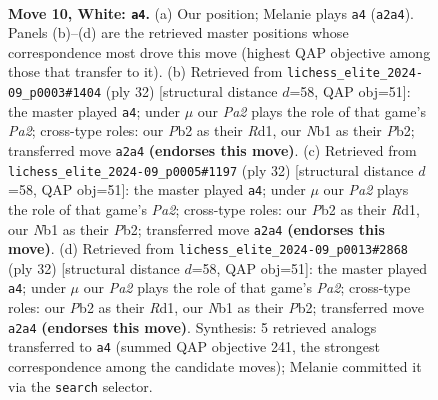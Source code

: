 \documentclass[11pt]{article}
\begin{document}
\clearpage

\begin{figure}[p]\centering
\begin{subfigure}{0.46\textwidth}\centering
\resizebox{\linewidth}{!}{%
\newchessgame
\chessboard[
  setfen={rnbkr3/1p3ppp/p3pn2/2b5/8/1B2PN2/PP3PPP/RNB2RK1 w - - 2 10},
  showmover=false,
  pgfstyle=straightmove, color=movearrow, markmove={a2-a4}
]}
\caption{}
\end{subfigure}\hfill
\begin{subfigure}{0.46\textwidth}\centering
\resizebox{\linewidth}{!}{%
\newchessgame
\chessboard[
  setfen={r1b2rk1/5ppp/p3pn2/1pb5/8/3BPN2/PP3PPP/R1BR2K1 w - - 0 17},
  showmover=false,
  pgfstyle=straightmove, color=movearrow, markmove={a2-a4}
]}
\caption{}
\end{subfigure}
\\[4pt]
\begin{subfigure}{0.46\textwidth}\centering
\resizebox{\linewidth}{!}{%
\newchessgame
\chessboard[
  setfen={r1b2rk1/5ppp/p3pn2/1pb5/8/3BPN2/PP3PPP/R1BR2K1 w - - 0 17},
  showmover=false,
  pgfstyle=straightmove, color=movearrow, markmove={a2-a4}
]}
\caption{}
\end{subfigure}\hfill
\begin{subfigure}{0.46\textwidth}\centering
\resizebox{\linewidth}{!}{%
\newchessgame
\chessboard[
  setfen={r1b2rk1/5ppp/p3pn2/1pb5/8/3BPN2/PP3PPP/R1BR2K1 w - - 0 17},
  showmover=false,
  pgfstyle=straightmove, color=movearrow, markmove={a2-a4}
]}
\caption{}
\end{subfigure}
\caption{\textbf{Move 10, White: \texttt{a4}.} (a) Our position; Melanie plays \texttt{a4} (\texttt{a2a4}). Panels (b)--(d) are the retrieved master positions whose correspondence most drove this move (highest QAP objective among those that transfer to it). (b) Retrieved from \texttt{lichess\_elite\_2024-09\_p0003\#1404} (ply 32) [structural distance $d$=58, QAP obj=51]: the master played \texttt{a4}; under $\mu$ our \emph{Pa2} plays the role of that game's \emph{Pa2}; cross-type roles: our \emph{P}b2 as their \emph{R}d1, our \emph{N}b1 as their \emph{P}b2; transferred move \texttt{a2a4} \textbf{(endorses this move)}. (c) Retrieved from \texttt{lichess\_elite\_2024-09\_p0005\#1197} (ply 32) [structural distance $d$=58, QAP obj=51]: the master played \texttt{a4}; under $\mu$ our \emph{Pa2} plays the role of that game's \emph{Pa2}; cross-type roles: our \emph{P}b2 as their \emph{R}d1, our \emph{N}b1 as their \emph{P}b2; transferred move \texttt{a2a4} \textbf{(endorses this move)}. (d) Retrieved from \texttt{lichess\_elite\_2024-09\_p0013\#2868} (ply 32) [structural distance $d$=58, QAP obj=51]: the master played \texttt{a4}; under $\mu$ our \emph{Pa2} plays the role of that game's \emph{Pa2}; cross-type roles: our \emph{P}b2 as their \emph{R}d1, our \emph{N}b1 as their \emph{P}b2; transferred move \texttt{a2a4} \textbf{(endorses this move)}. Synthesis: 5 retrieved analogs transferred to \texttt{a4} (summed QAP objective 241, the strongest correspondence among the candidate moves); Melanie committed it via the \texttt{search} selector.}
\label{fig:thought-m18}
\end{figure}
\end{document}
